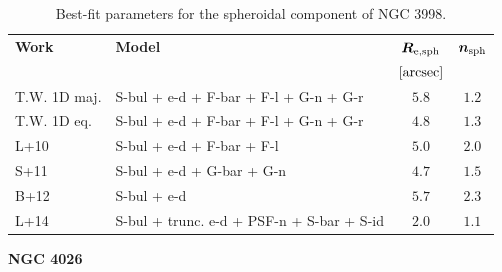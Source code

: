 \documentclass[preprint2]{emulateapj}
\begin{document}
  \begin{table}[h]
  \small
  \caption{Best-fit parameters for the spheroidal component of NGC 3998.}
  \begin{center}
  \begin{tabular}{llcc}
  \hline
  {\bf Work} & {\bf Model}   & $\bm R_{\rm e,sph}$    & $\bm n_{\rm sph}$ \\
    &  &  $[\rm arcsec]$ & \\
  \hline
  T.W. 1D maj. & S-bul + e-d + F-bar + F-l + G-n + G-r & $5.8$  &  $1.2$ \\
  T.W. 1D eq.  & S-bul + e-d + F-bar + F-l + G-n + G-r & $4.8$  &  $1.3$ \\
  \hline
  L+10         & S-bul + e-d + F-bar + F-l & $5.0$  &  $2.0$ \\
  S+11         & S-bul + e-d + G-bar + G-n & $4.7$  &  $1.5$ \\
  B+12         & S-bul + e-d & $5.7$  &  $2.3$ \\
  L+14         & S-bul + trunc. e-d + PSF-n + S-bar + S-id & $2.0$  &  $1.1$ \\
  \hline
  \end{tabular}
  \end{center}
  \label{tab:n3998}
  \end{table} 



  \clearpage\newpage\noindent
  {\bf NGC 4026 \\}
\end{document}
